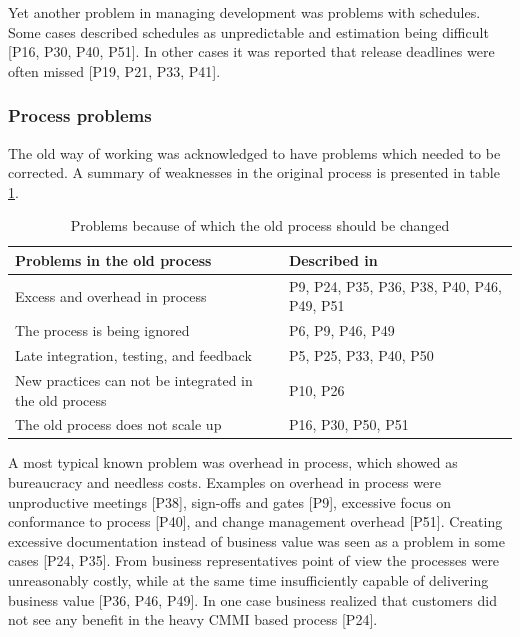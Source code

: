 Yet another problem in managing development was problems with schedules.
Some cases described schedules as unpredictable and estimation being difficult
[P16, P30, P40, P51]. In other cases it was reported that release deadlines were
often missed [P19, P21, P33, P41].

\subsubsection{Process problems}

The old way of working was acknowledged to have problems which needed to be
corrected. A summary of weaknesses in the original process is presented in table
\ref{table:reasonstochange_process}.

\begin{table}[b]
    \centering
    \begin{tabular}{ >{\raggedright\arraybackslash}p{}
                     >{\raggedright\arraybackslash}p{} }
        \toprule
        Problems in the old process           &  Described in  \\
        \midrule
        Excess and overhead in process     &  P9, P24, P35, P36, P38, P40, P46, P49, P51  \\
        The process is being ignored       &  P6, P9, P46, P49  \\
        Late integration, testing, and feedback  &  P5, P25, P33, P40, P50  \\
        New practices can not be integrated in the old process  &  P10, P26  \\
        The old process does not scale up  &  P16, P30, P50, P51  \\
        \bottomrule
    \end{tabular}
    \caption{Problems because of which the old process should be changed}
    \label{table:reasonstochange_process}
\end{table}

A most typical known problem was overhead in process, which showed as bureaucracy and
needless costs. Examples on overhead in process were unproductive meetings
[P38], sign-offs and gates [P9], excessive focus on conformance to process
[P40], and change management overhead [P51]. Creating excessive documentation
instead of business value was seen as a problem in some cases [P24, P35]. From
business representatives point of view the processes were unreasonably costly,
while at the same time insufficiently capable of delivering business value [P36,
P46, P49]. In one case business realized that customers did not see any benefit
in the heavy CMMI based process [P24].

